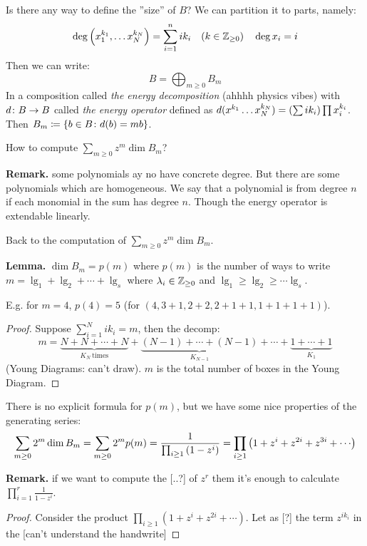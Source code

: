 \documentclass[]{../../../../tex/classes/styledArticle}
\begin{document}
	Is there any way to define the ''size'' of $B$? We can partition it to parts, namely: 
	\[ \deg\left ( x_1^{k_1}, \dots x_N^{k_N} \right ) = \sum_{i = 1}^{n} ik_i\quad(k \in \mathbb{Z}_{\ge 0})\quad \deg x_i = i \]
	Then we can write: 
	\[ B = \bigoplus_{m \ge 0}B_m \]
	In a composition called \textit{the energy decomposition} (ahhhh physics vibes) with $d \colon B \to B$ called \textit{the energy operator} defined as $d(x^{k_1} \dots x_N^{k_N}) = \left ( \sum i k_i \right ) \prod x_i^{k_i}$. Then $B_m \coloneqq \{b \in B \colon d(b) = mb\}$. 
	
	How to compute $\sum_{m \ge 0} z^{m}\dim B_m$? 
	
	\textbf{Remark. } some polynomials ay no have concrete degree. But there are some polynomials which are homogeneous. We say that a polynomial is from degree $n$ if each monomial in the sum has degree $n$. Though the energy operator is extendable linearly. 
	
	Back to the computation of $\sum_{m \ge 0} z^{m}\dim B_m$. 
	
	\textbf{Lemma. }$\dim B_m = p(m)$ where $p(m)$ is the number of ways to write $m = \lg_1 + \lg_2 + \cdots + \lg_s$ where $\lambda_i \in \mathbb{Z}_{\ge 0}$ and $\lg_1 \ge \lg_2 \ge \cdots \lg_s$. 
	
	E.g. for $m = 4$, $p(4) = 5$ (for $(4, 3 + 1, 2 + 2, 2 + 1 + 1, 1 + 1 + 1 + 1)$). \begin{proof}
		Suppose $\sum^{N}_{i = 1} ik_i = m$, then the decomp: 
		\[ m = \underbrace{N + N + \cdots  + N}_{K_N \ \text{times}} + \underbrace{(N - 1) + \cdots + (N - 1)}_{K_{N - 1}} + \cdots + \underbrace{1 + \cdots + 1}_{K_1} \]
		(Young Diagrams: can't draw). $m$ is the total number of boxes in the Young Diagram. 
	\end{proof}
	
	There is no explicit formula for $p(m)$, but we have some nice properties of the generating series: 
	\[ \sum_{m \ge 0}2^{m}\dim B_m = \sum_{m \ge 0}2^{m}p(m) = \frac{1}{\prod_{i \ge 1}\cl{1 - z^{i}}} = \prod_{i \ge 1}\cl{1+ z^{i} + z^{2i} + z^{3i} + \cdots} \]
	
	\textbf{Remark. }if we want to compute the [..?] of $z^{r}$ them it's enough to calculate $\prod_{i = 1}^{r}\frac{1}{1 - z^{i}}$. \begin{proof}
		Consider the product $\prod_{i \ge 1}(1 + z^{i} + z^{2i} + \cdots)$. Let as [?] the term $z^{i k_i}$ in the  
		[can't understand the handwrite]
	\end{proof}
	
\end{document}

